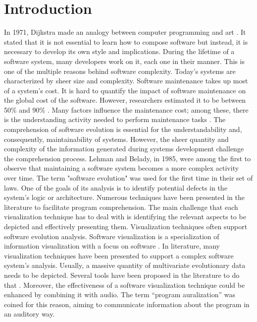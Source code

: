 \chapter{Introduction}

In 1971, Dijkstra made an analogy between computer programming and art \cite{Dijkstra1971a}.
It stated that it is not essential to learn how to compose software but instead, it is necessary to develop its own style and implications. 
During the lifetime of a software system, many developers work on it, each one in their manner. This is one of the multiple reasons behind software complexity. 
Today's systems are characterized by sheer size and complexity. Software maintenance takes up most of a system's cost. It is hard to quantify the impact of software maintenance on the global cost of the software. 
However, researchers estimated it to be between 50\% and 90\% \cite{Davis1995} \cite{Sommerville1995}\cite{Erlikh2000} \cite{seacord2003}. Many factors influence the maintenance cost; among these, there is the understanding activity needed to perform maintenance tasks \cite{Corbi1989}. The comprehension of software evolution is essential for the understandability and, consequently, maintainability of systems. However, the sheer quantity and complexity of the information generated during systems development challenge the comprehension process. Lehman and Belady, in 1985, were among the first to observe that maintaining a software system becomes a more complex activity over time. \cite{Lehman1985} The term "software evolution" was used for the first time in their set of laws.  One of the goals of its analysis is to identify potential defects in the system's logic or architecture. Numerous techniques have been presented in the literature to facilitate program comprehension. The main challenge that each visualization technique has to deal with is identifying the relevant aspects to be depicted and effectively presenting them. Visualization techniques often support software evolution analysis. Software visualization is a specialization of information visualization with a focus on software \cite{Lanza2003}. In literature, many visualization techniques have been presented to support a complex software system's analysis. Usually, a massive quantity of multivariate evolutionary data needs to be depicted. Several tools have been proposed in the literature to do that \cite{Merino2018a}. Moreover, the effectiveness of a software visualization technique could be enhanced by combining it with audio. The term ``program auralization'' was coined for this reason, aiming to communicate information about the program in an auditory way.
